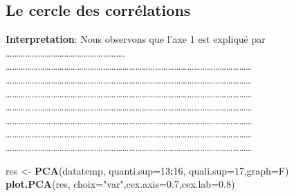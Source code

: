 \documentclass[
]{article}
\newenvironment{Shaded}{\begin{snugshade}}{\end{snugshade}}
\newcommand{\DataTypeTok}[1]{\textcolor[rgb]{0.13,0.29,0.53}{#1}}
\newcommand{\DecValTok}[1]{\textcolor[rgb]{0.00,0.00,0.81}{#1}}
\newcommand{\FloatTok}[1]{\textcolor[rgb]{0.00,0.00,0.81}{#1}}
\newcommand{\KeywordTok}[1]{\textcolor[rgb]{0.13,0.29,0.53}{\textbf{#1}}}
\newcommand{\NormalTok}[1]{#1}
\newcommand{\OperatorTok}[1]{\textcolor[rgb]{0.81,0.36,0.00}{\textbf{#1}}}
\newcommand{\StringTok}[1]{\textcolor[rgb]{0.31,0.60,0.02}{#1}}
\begin{document}
\hypertarget{le-cercle-des-corruxe9lations}{%
\subsection{\texorpdfstring{\textbf{Le cercle des
corrélations}}{Le cercle des corrélations}}\label{le-cercle-des-corruxe9lations}}

\textbf{Interpretation}: Nous observons que l'axe 1 est expliqué par
\ldots\ldots\ldots\ldots\ldots\ldots\ldots\ldots\ldots\ldots\ldots\ldots\ldots\ldots\ldots\ldots\ldots\ldots.\\
\ldots\ldots\ldots\ldots\ldots\ldots\ldots\ldots\ldots\ldots\ldots\ldots\ldots\ldots\ldots\ldots\ldots\ldots\ldots\ldots\ldots\ldots\ldots\ldots\ldots\ldots\ldots\ldots\ldots\ldots\ldots\ldots\ldots\ldots\ldots\ldots\ldots\ldots{}
\ldots\ldots\ldots\ldots\ldots\ldots\ldots\ldots\ldots\ldots\ldots\ldots\ldots\ldots\ldots\ldots\ldots\ldots\ldots\ldots\ldots\ldots\ldots\ldots\ldots\ldots\ldots\ldots\ldots\ldots\ldots\ldots\ldots\ldots\ldots\ldots\ldots\ldots{}
\ldots\ldots\ldots\ldots\ldots\ldots\ldots\ldots\ldots\ldots\ldots\ldots\ldots\ldots\ldots\ldots\ldots\ldots\ldots\ldots\ldots\ldots\ldots\ldots\ldots\ldots\ldots\ldots\ldots\ldots\ldots\ldots\ldots\ldots\ldots\ldots\ldots\ldots{}
\ldots\ldots\ldots\ldots\ldots\ldots\ldots\ldots\ldots\ldots\ldots\ldots\ldots\ldots\ldots\ldots\ldots\ldots\ldots\ldots\ldots\ldots\ldots\ldots\ldots\ldots\ldots\ldots\ldots\ldots\ldots\ldots\ldots\ldots\ldots\ldots\ldots\ldots{}
\ldots\ldots\ldots\ldots\ldots\ldots\ldots\ldots\ldots\ldots\ldots\ldots\ldots\ldots\ldots\ldots\ldots\ldots\ldots\ldots\ldots\ldots\ldots\ldots\ldots\ldots\ldots\ldots\ldots\ldots\ldots\ldots\ldots\ldots\ldots\ldots\ldots\ldots{}
\ldots\ldots\ldots\ldots\ldots\ldots\ldots\ldots\ldots\ldots\ldots\ldots\ldots\ldots\ldots\ldots\ldots\ldots\ldots\ldots\ldots\ldots\ldots\ldots\ldots\ldots\ldots\ldots\ldots\ldots\ldots\ldots\ldots\ldots\ldots\ldots\ldots\ldots{}
\ldots\ldots\ldots\ldots\ldots\ldots\ldots\ldots\ldots\ldots\ldots\ldots\ldots\ldots\ldots\ldots\ldots\ldots\ldots\ldots\ldots\ldots\ldots\ldots\ldots\ldots\ldots\ldots\ldots\ldots\ldots\ldots\ldots\ldots\ldots\ldots\ldots\ldots{}

\begin{Shaded}
\begin{Highlighting}[]
\NormalTok{res <-}\StringTok{ }\KeywordTok{PCA}\NormalTok{(datatemp, }\DataTypeTok{quanti.sup=}\DecValTok{13}\OperatorTok{:}\DecValTok{16}\NormalTok{, }\DataTypeTok{quali.sup=}\DecValTok{17}\NormalTok{,}\DataTypeTok{graph=}\NormalTok{F)}
\KeywordTok{plot.PCA}\NormalTok{(res, }\DataTypeTok{choix=}\StringTok{"var"}\NormalTok{,}\DataTypeTok{cex.axis=}\FloatTok{0.7}\NormalTok{,}\DataTypeTok{cex.lab=}\FloatTok{0.8}\NormalTok{)}
\end{Highlighting}
\end{Shaded}
\end{document}
